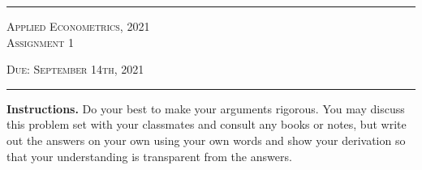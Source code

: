 \documentclass[11pt]{article}
\begin{document}

\fancyhead[C]{}
\hrule \medskip
\begin{minipage}{0.9\textwidth}
\centering
\large
\textsc{Applied Econometrics, 2021}\\
\textsc{Assignment} 1\\
\normalsize

\textsc{Due: September 14th, 2021}
\end{minipage}
\medskip \hrule
\bigskip



\noindent \textbf{Instructions.} Do your best to make your arguments
rigorous. You may discuss this problem set with your classmates and consult
any books or notes, but write out the answers on your own using your own
words and show your derivation so that your understanding is transparent
from the answers.  \bigskip
\end{document}
